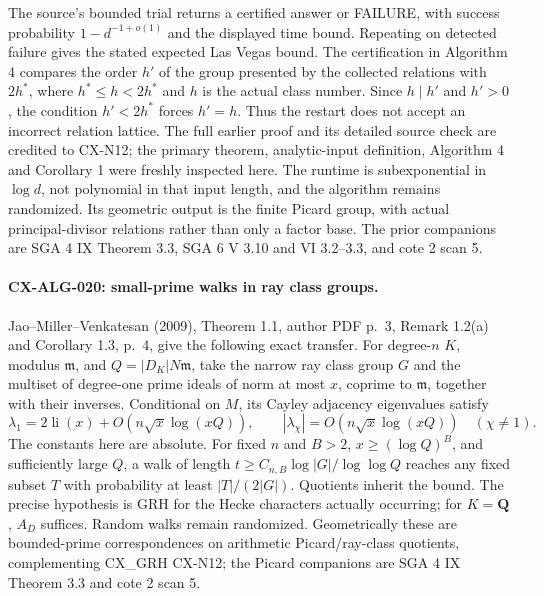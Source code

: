 \documentclass[11pt,a4paper]{article}
\begin{document}
The source's bounded trial returns a certified answer or FAILURE, with
success probability $1-d^{-1+o(1)}$ and the displayed time bound. Repeating
on detected failure gives the stated expected Las Vegas bound. The
certification in Algorithm 4 compares the order $h'$ of the group presented
by the collected relations with $2h^*$, where $h^*\le h<2h^*$ and $h$
is the actual class number. Since $h\mid h'$ and $h'>0$, the condition
$h'<2h^*$ forces $h'=h$. Thus the restart does not accept an incorrect
relation lattice. The full earlier proof and its detailed source check are
credited to CX-N12; the primary theorem, analytic-input definition,
Algorithm 4 and Corollary 1 were freshly inspected here.
The runtime is subexponential in $\log d$, not polynomial in that input
length, and the algorithm remains randomized. Its geometric output is the
finite Picard group, with actual principal-divisor relations rather than
only a factor base. The prior companions are SGA 4 IX Theorem 3.3,
SGA 6 V 3.10 and VI 3.2--3.3, and cote 2 scan 5.

\paragraph{CX-ALG-020: small-prime walks in ray class groups.}
Jao--Miller--Venkatesan (2009), Theorem 1.1, author PDF p.~3,
Remark 1.2(a) and Corollary 1.3, p.~4, give the following exact transfer.
For degree-$n$ $K$, modulus $\mathfrak m$, and
$Q=|D_K|N\mathfrak m$, take the narrow ray class group $G$ and the
multiset of degree-one prime ideals of norm at most $x$, coprime to
$\mathfrak m$, together with their inverses. Conditional on $M$, its
Cayley adjacency eigenvalues satisfy
\[
 \lambda_1=2\operatorname{li}(x)+O(n\sqrt x\log(xQ)),\qquad
 |\lambda_\chi|=O(n\sqrt x\log(xQ))\quad(\chi\ne1).
\]
The constants here are absolute. For fixed $n$ and $B>2$,
$x\ge(\log Q)^B$, and sufficiently large $Q$, a walk of length
$t\ge C_{n,B}\log|G|/\log\log Q$ reaches any fixed subset $T$ with
probability at least $|T|/(2|G|)$. Quotients inherit the bound.
The precise hypothesis is GRH for the Hecke characters actually occurring;
for $K=\mathbf Q$, $A_D$ suffices. Random walks remain randomized.
Geometrically these are bounded-prime correspondences on arithmetic
Picard/ray-class quotients, complementing CX\_GRH CX-N12; the Picard
companions are SGA 4 IX Theorem 3.3 and cote 2 scan 5.
\end{document}
